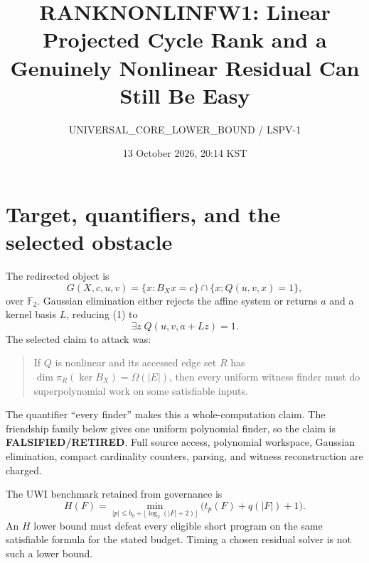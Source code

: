 \documentclass[11pt]{article}
\title{RANKNONLINFW1: Linear Projected Cycle Rank and a\\Genuinely Nonlinear Residual Can Still Be Easy}
\author{UNIVERSAL\_CORE\_LOWER\_BOUND / LSPV-1}
\date{13 October 2026, 20:14 KST}
\newcommand{\RET}{\textbf{FALSIFIED/RETIRED}}
\begin{document}
\maketitle

\begin{center}
\end{center}

\section{Target, quantifiers, and the selected obstacle}
The redirected object is
\[
 G(X,c,u,v)=\{x:B_Xx=c\}\cap\{x:Q(u,v,x)=1\},              \tag{1}
\]
over $\mathbb F_2$.  Gaussian elimination either rejects the affine system or
returns $a$ and a kernel basis $L$, reducing (1) to
\[
 \exists z\;Q(u,v,a+Lz)=1.                                \tag{2}
\]
The selected claim to attack was:
\begin{quote}
If $Q$ is nonlinear and its accessed edge set $R$ has
$\dim\pi_R(\ker B_X)=\Omega(|E|)$, then every uniform witness finder must do
superpolynomial work on some satisfiable inputs.
\end{quote}
The quantifier ``every finder'' makes this a whole-computation claim.  The
friendship family below gives one uniform polynomial finder, so the claim is
\RET{}.  Full source access, polynomial workspace, Gaussian elimination,
compact cardinality counters, parsing, and witness reconstruction are charged.

The UWI benchmark retained from governance is
\[
 H(F)=\min_{|p|\le b_0+\lfloor\log_2(|F|+2)\rfloor}
       \bigl(t_p(F)+q(|F|)+1\bigr).                         \tag{3}
\]
An $H$ lower bound must defeat every eligible short program on the same
satisfiable formula for the stated budget.  Timing a chosen residual solver is
not such a lower bound.
\end{document}
